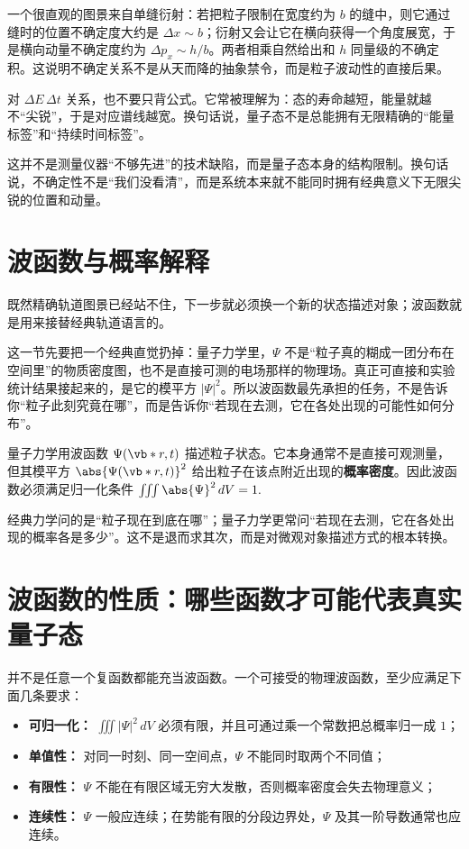 \documentclass[lang=cn,11pt]{elegantbook}
\newcommand{\bridge}[1]{\begin{note}#1\end{note}}
\begin{document}
一个很直观的图景来自单缝衍射：若把粒子限制在宽度约为 \(b\) 的缝中，则它通过缝时的位置不确定度大约是 \(\Delta x\sim b\)；衍射又会让它在横向获得一个角度展宽，于是横向动量不确定度约为 \(\Delta p_x\sim h/b\)。两者相乘自然给出和 \(h\) 同量级的不确定积。这说明不确定关系不是从天而降的抽象禁令，而是粒子波动性的直接后果。

对 \(\Delta E\,\Delta t\) 关系，也不要只背公式。它常被理解为：态的寿命越短，能量就越不“尖锐”，于是对应谱线越宽。换句话说，量子态不是总能拥有无限精确的“能量标签”和“持续时间标签”。

\begin{note}
这并不是测量仪器“不够先进”的技术缺陷，而是量子态本身的结构限制。换句话说，不确定性不是“我们没看清”，而是系统本来就不能同时拥有经典意义下无限尖锐的位置和动量。
\end{note}

\section{波函数与概率解释}

既然精确轨道图景已经站不住，下一步就必须换一个新的状态描述对象；波函数就是用来接替经典轨道语言的。

这一节先要把一个经典直觉扔掉：量子力学里，\(\Psi\) 不是“粒子真的糊成一团分布在空间里”的物质密度图，也不是直接可测的电场那样的物理场。真正可直接和实验统计结果接起来的，是它的模平方 \(|\Psi|^2\)。所以波函数最先承担的任务，不是告诉你“粒子此刻究竟在哪”，而是告诉你“若现在去测，它在各处出现的可能性如何分布”。

量子力学用波函数 \(\Psi(\vb*{r},t)\) 描述粒子状态。它本身通常不是直接可观测量，但其模平方
 \(\abs{\Psi(\vb*{r},t)}^2\) 
给出粒子在该点附近出现的\textbf{概率密度}。因此波函数必须满足归一化条件
 \(\iiint \abs{\Psi}^2\,dV=1.\) 

\bridge{经典力学问的是“粒子现在到底在哪”；量子力学更常问“若现在去测，它在各处出现的概率各是多少”。这不是退而求其次，而是对微观对象描述方式的根本转换。}

\section{波函数的性质：哪些函数才可能代表真实量子态}

并不是任意一个复函数都能充当波函数。一个可接受的物理波函数，至少应满足下面几条要求：
\begin{itemize}
 \item \textbf{可归一化：} \(\iiint |\Psi|^2\,dV\) 必须有限，并且可通过乘一个常数把总概率归一成 \(1\)；
 \item \textbf{单值性：} 对同一时刻、同一空间点，\(\Psi\) 不能同时取两个不同值；
 \item \textbf{有限性：} \(\Psi\) 不能在有限区域无穷大发散，否则概率密度会失去物理意义；
 \item \textbf{连续性：} \(\Psi\) 一般应连续；在势能有限的分段边界处，\(\Psi\) 及其一阶导数通常也应连续。
\end{itemize}
\end{document}
